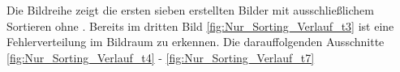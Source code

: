 Die Bildreihe zeigt die ersten sieben erstellten Bilder mit ausschließlichem 
Sortieren ohne . Bereits im dritten Bild 
\ref{fig:Nur_Sorting_Verlauf_t3} ist eine 
Fehlerverteilung im Bildraum zu erkennen. Die darauffolgenden Ausschnitte 
\ref{fig:Nur_Sorting_Verlauf_t4} - \ref{fig:Nur_Sorting_Verlauf_t7}